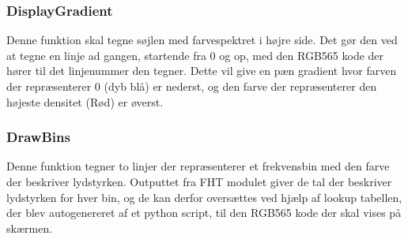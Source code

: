 \subsubsection{DisplayGradient}
Denne funktion skal tegne søjlen med farvespektret i højre side. Det gør den ved at tegne en linje ad gangen, startende fra 0 og op, med den RGB565 kode der hører til det linjenummer den tegner.
Dette vil give en pæn gradient hvor farven der repræsenterer 0 (dyb blå) er nederst, og den farve der repræsenterer den højeste densitet (Rød) er øverst.

\subsubsection{DrawBins}
Denne funktion tegner to linjer der repræsenterer et frekvensbin med den farve der beskriver lydstyrken. Outputtet fra FHT modulet giver de tal der beskriver lydstyrken for hver bin, og de kan derfor oversættes ved hjælp af lookup tabellen, der blev autogenereret af et python script, til den RGB565 kode der skal vises på skærmen.

%